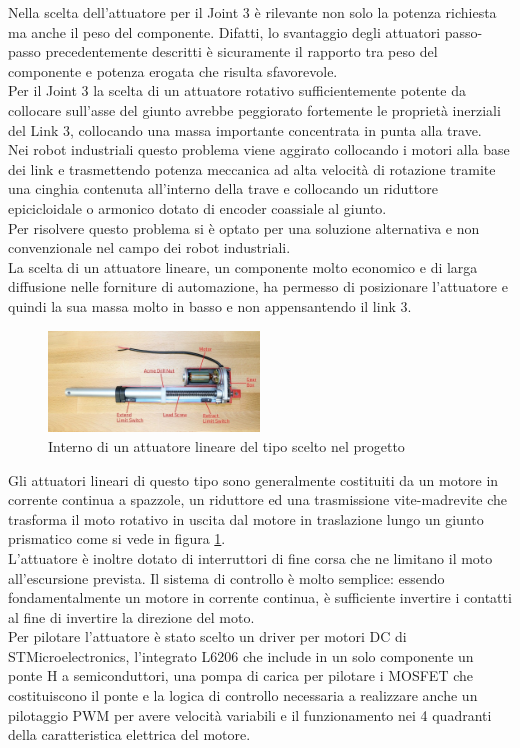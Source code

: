 \documentclass[%
corpo=11pt,
twoside,
 stile=classica,
oldstyle,
greek,%
]{toptesi}
\begin{document}
	Nella scelta dell'attuatore per il Joint 3 è rilevante non solo la potenza richiesta ma anche il peso del componente. Difatti, lo svantaggio degli attuatori passo-passo precedentemente descritti è sicuramente il rapporto tra peso del componente e potenza erogata che risulta sfavorevole.\\
	Per il Joint 3 la scelta di un attuatore rotativo sufficientemente potente da collocare sull'asse del giunto avrebbe peggiorato fortemente le proprietà inerziali del Link 3, collocando una massa importante concentrata in punta alla trave. \\
	Nei robot industriali questo problema viene aggirato collocando i motori alla base dei link e trasmettendo potenza meccanica ad alta velocità di rotazione tramite una cinghia contenuta all'interno della trave e collocando un riduttore epicicloidale o armonico dotato di encoder coassiale al giunto. \\
	Per risolvere questo problema si è optato per una soluzione alternativa e non convenzionale nel campo dei robot industriali. 
	\\
	La scelta di un attuatore lineare, un componente molto economico e di larga diffusione nelle forniture di automazione, ha permesso di posizionare l'attuatore e quindi la sua massa molto in basso e non appensantendo il link 3. \\
		\begin{figure}
		\centering
		\includegraphics[width=0.5\textwidth]{image/linearact.jpg}
		\caption{Interno di un attuatore lineare del tipo scelto nel progetto }
		\label{fig:linearact}
	\end{figure}
	Gli attuatori lineari di questo tipo sono generalmente costituiti da un motore in corrente continua a spazzole, un riduttore ed una trasmissione vite-madrevite che trasforma il moto rotativo in uscita dal motore in traslazione lungo un giunto prismatico come si vede in figura \ref{fig:linearact}.\\
	L'attuatore è inoltre dotato di interruttori di fine corsa che ne limitano il moto all'escursione prevista. Il sistema di controllo è molto semplice: essendo fondamentalmente un motore in corrente continua, è sufficiente invertire i contatti al fine di invertire la direzione del moto.\\ 
	Per pilotare l'attuatore è stato scelto un driver per motori DC di STMicroelectronics, l'integrato L6206 che include in un solo componente un ponte H a semiconduttori, una pompa di carica per pilotare i MOSFET che costituiscono il ponte e la logica di controllo necessaria a realizzare anche un pilotaggio PWM per avere velocità variabili e il funzionamento nei 4 quadranti della caratteristica elettrica del motore. 
	
\end{document}
